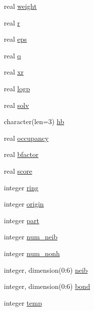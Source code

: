 \begin{DoxyCompactItemize}
real \hyperlink{structcalc__xscore_1_1txatom_a4949f0dbec8135427d1b46711b88e0e5}{weight}
\item 
real \hyperlink{structcalc__xscore_1_1txatom_afabf69a10d10a0c4fe08fda0eb585efb}{r}
\item 
real \hyperlink{structcalc__xscore_1_1txatom_ac850e65e7b750bdd15e8fd204e523e78}{eps}
\item 
real \hyperlink{structcalc__xscore_1_1txatom_a5083f011441818307a67358328628c1c}{q}
\item 
real \hyperlink{structcalc__xscore_1_1txatom_a182137748f9b4a83a04eabc9dcd1a4ef}{xr}
\item 
real \hyperlink{structcalc__xscore_1_1txatom_aec6181c7524ffb6eaaac59479be09d2f}{logp}
\item 
real \hyperlink{structcalc__xscore_1_1txatom_abb928a0fb1fbb6c4c5e3e73ac5cc8b32}{solv}
\item 
character(len=3) \hyperlink{structcalc__xscore_1_1txatom_a951c00465fa76dce90e8b5defdae1a68}{hb}
\item 
real \hyperlink{structcalc__xscore_1_1txatom_a89a14de91737dd71bdc641b29025b3a3}{occupancy}
\item 
real \hyperlink{structcalc__xscore_1_1txatom_af13ea7c6af05c00f717b4cb9682641fe}{bfactor}
\item 
real \hyperlink{structcalc__xscore_1_1txatom_abf2d95af74459e9fcc4fa8d7a7b3120a}{score}
\item 
integer \hyperlink{structcalc__xscore_1_1txatom_a084449ced0e3dd21760d771db5534e4a}{ring}
\item 
integer \hyperlink{structcalc__xscore_1_1txatom_a3d1e346ecaeb1ce3cb51991a3e81f99c}{origin}
\item 
integer \hyperlink{structcalc__xscore_1_1txatom_aaec30922d58c5fd22adf45fb3b015d02}{part}
\item 
integer \hyperlink{structcalc__xscore_1_1txatom_ab132c349deb7bad69978755afd6fa865}{num\-\_\-neib}
\item 
integer \hyperlink{structcalc__xscore_1_1txatom_ace358f9084576aae47067aa0afd306f2}{num\-\_\-nonh}
\item 
integer, dimension(0\-:6) \hyperlink{structcalc__xscore_1_1txatom_a4addf7e0bc4335471a9624fa2746aaa2}{neib}
\item 
integer, dimension(0\-:6) \hyperlink{structcalc__xscore_1_1txatom_a86a528bf7bb0773498b6d1721bd75748}{bond}
\item 
integer \hyperlink{structcalc__xscore_1_1txatom_a0e4700b423c3a49a00fce1a6b1299102}{temp}
\end{DoxyCompactItemize}


